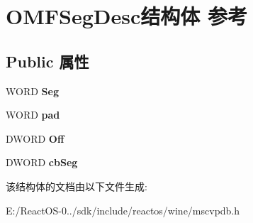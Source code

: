 \hypertarget{struct_o_m_f_seg_desc}{}\section{O\+M\+F\+Seg\+Desc结构体 参考}
\label{struct_o_m_f_seg_desc}
\subsection*{Public 属性}
\begin{DoxyCompactItemize}
\item 
\mbox{\label{struct_o_m_f_seg_desc_aa2d723aca8736a355d15200ec4eff11e}} 
W\+O\+RD {\bfseries Seg}
\item 
\mbox{\label{struct_o_m_f_seg_desc_aa2f98974c8aa073719a931853ca9f946}} 
W\+O\+RD {\bfseries pad}
\item 
\mbox{\label{struct_o_m_f_seg_desc_a720c083344fa3ecb63c4d9ab4c30b625}} 
D\+W\+O\+RD {\bfseries Off}
\item 
\mbox{\label{struct_o_m_f_seg_desc_a38fba3834943bf1807b4b9639b056002}} 
D\+W\+O\+RD {\bfseries cb\+Seg}
\end{DoxyCompactItemize}


该结构体的文档由以下文件生成\+:\begin{DoxyCompactItemize}
\item 
E\+:/\+React\+O\+S-\/0../sdk/include/reactos/wine/mscvpdb.\+h\end{DoxyCompactItemize}
